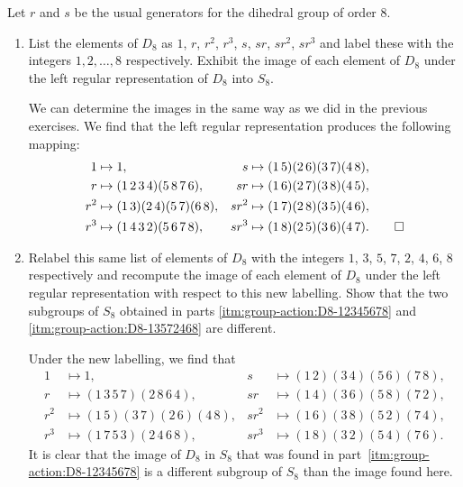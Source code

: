  Let $r$ and $s$ be the usual generators for the dihedral
group of order $8$.
\begin{enumerate}
\item \label{itm:group-action:D8-12345678}
  List the elements of $D_8$ as $1$, $r$, $r^2$, $r^3$, $s$, $sr$,
  $sr^2$, $sr^3$ and label these with the integers $1,2,\dots,8$
  respectively. Exhibit the image of each element of $D_8$ under the
  left regular representation of $D_8$ into $S_8$.
  \begin{solution}
    We can determine the images in the same way as we did in the
    previous exercises. We find that the left regular representation
    produces the following mapping:
    \begin{align*}
      1 &\mapsto 1,
      & s &\mapsto (1\,5)(2\,6)(3\,7)(4\,8), \\
      r &\mapsto (1\,2\,3\,4)(5\,8\,7\,6),
      & sr &\mapsto (1\,6)(2\,7)(3\,8)(4\,5), \\
      r^2 &\mapsto (1\,3)(2\,4)(5\,7)(6\,8),
      & sr^2 &\mapsto (1\,7)(2\,8)(3\,5)(4\,6), \\
      r^3 &\mapsto (1\,4\,3\,2)(5\,6\,7\,8),
      & sr^3 &\mapsto (1\,8)(2\,5)(3\,6)(4\,7). \qedhere
    \end{align*}
  \end{solution}

\item \label{itm:group-action:D8-13572468} Relabel this same list of
  elements of $D_8$ with the integers $1$, $3$, $5$, $7$, $2$, $4$,
  $6$, $8$ respectively and recompute the image of each element of
  $D_8$ under the left regular representation with respect to this new
  labelling. Show that the two subgroups of $S_8$ obtained in parts
  \ref{itm:group-action:D8-12345678} and
  \ref{itm:group-action:D8-13572468} are different.
  \begin{solution}
    Under the new labelling, we find that
    \begin{align*}
      1 &\mapsto 1,
      & s &\mapsto (1\,2)(3\,4)(5\,6)(7\,8), \\
      r &\mapsto (1\,3\,5\,7)(2\,8\,6\,4),
      & sr &\mapsto (1\,4)(3\,6)(5\,8)(7\,2), \\
      r^2 &\mapsto (1\,5)(3\,7)(2\,6)(4\,8),
      & sr^2 &\mapsto (1\,6)(3\,8)(5\,2)(7\,4), \\
      r^3 &\mapsto (1\,7\,5\,3)(2\,4\,6\,8),
      & sr^3 &\mapsto (1\,8)(3\,2)(5\,4)(7\,6).
    \end{align*}
    It is clear that the image of $D_8$ in $S_8$ that was found in
    part~\ref{itm:group-action:D8-12345678} is a different subgroup of
    $S_8$ than the image found here.
  \end{solution}
\end{enumerate}

